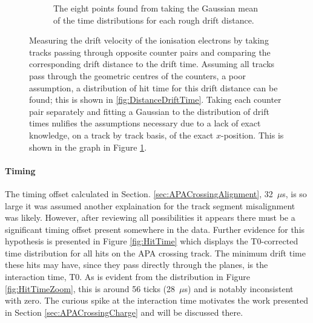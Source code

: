 \begin{figure}
\begin{subfigure}[t]{0.48\linewidth}
    \caption{The eight points found from taking the Gaussian mean of the time distributions for each rough drift distance.}
    \label{fig:DriftVelocityGraph}
  \end{subfigure}
  \caption[Measuring the drift velocity of the ionisation electrons by taking tracks passing through opposite counter pairs and comparing the corresponding drift distance to the drift time.]{Measuring the drift velocity of the ionisation electrons by taking tracks passing through opposite counter pairs and comparing the corresponding drift distance to the drift time.  Assuming all tracks pass through the geometric centres of the counters, a poor assumption, a distribution of hit time for this drift distance can be found; this is shown in \ref{fig:DistanceDriftTime}.  Taking each counter pair separately and fitting a Gaussian to the distribution of drift times nulifies the assumptions necessary due to a lack of exact knowledge, on a track by track basis, of the exact $x$-position.  This is shown in the graph in Figure \ref{fig:DriftVelocityGraph}.}
  \label{fig:DriftVelocity}
\end{figure}

\paragraph{Timing}

The timing offset calculated in Section. \ref{sec:APACrossingAlignment}, 32~$\mu$s, is so large it was assumed another explaination for the track segment misalignment was likely.  However, after reviewing all possibilities it appears there must be a significant timing offset present somewhere in the data.  Further evidence for this hypothesis is presented in Figure \ref{fig:HitTime} which displays the T0-corrected time distribution for all hits on the APA crossing track.  The minimum drift time these hits may have, since they pass directly through the planes, is the interaction time, T0.  As is evident from the distribution in Figure \ref{fig:HitTimeZoom}, this is around 56 ticks (28~$\mu$s) and is notably inconsistent with zero.  The curious spike at the interaction time motivates the work presented in Section \ref{sec:APACrossingCharge} and will be discussed there.

